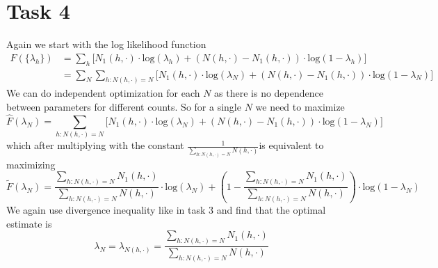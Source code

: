 \documentclass[%
   11pt,              %
   ngerman,           %
   a4paper,           %
   DIV11,             %
]{scrartcl}%
\begin{document}
\section*{Task 4}
Again we start with the log likelihood function
\begin{align*}
	F(\{\lambda_h\}) &= \sum_h \bigg[N_1(h,\cdot)\cdot\text{log}(\lambda_h) + (N(h,\cdot) - N_1(h, \cdot))\cdot \text{log}(1 - \lambda_h)\bigg] \\
	&= \sum_N \sum_{h\colon N(h,\cdot) = N} \bigg[N_1(h,\cdot)\cdot\text{log}(\lambda_N) + (N(h,\cdot) - N_1(h, \cdot))\cdot \text{log}(1 - \lambda_N)\bigg] 
\end{align*}
We can do independent optimization for each $N$ as there is no dependence between parameters for different counts. So for a single $N$ we need to maximize
\begin{equation*}
	\hat{F}(\lambda_N) = \sum_{h\colon N(h,\cdot) = N} \bigg[N_1(h,\cdot)\cdot\text{log}(\lambda_N) + (N(h,\cdot) - N_1(h, \cdot))\cdot \text{log}(1 - \lambda_N)\bigg] 
\end{equation*}
which after multiplying with the constant $\frac{1}{\sum_{h\colon N(h,\cdot) = N}N(h,\cdot)}$is equivalent to maximizing
\begin{equation*}
	\tilde{F}(\lambda_N) = \frac{\sum_{h\colon N(h,\cdot) = N}N_1(h,\cdot)}{\sum_{h\colon N(h,\cdot) = N}N(h,\cdot)}\cdot\text{log}(\lambda_N) + (1 - \frac{\sum_{h\colon N(h,\cdot) = N}N_1(h,\cdot)}{\sum_{h\colon N(h,\cdot) = N}N(h,\cdot)})\cdot \text{log}(1 - \lambda_N)
\end{equation*}
We again use divergence inequality like in task 3 and find that the optimal estimate is
\begin{equation*}
	\lambda_N = \lambda_{N(h,\cdot)} = \frac{\sum_{h\colon N(h,\cdot) = N}N_1(h,\cdot)}{\sum_{h\colon N(h,\cdot) = N}N(h,\cdot)}
\end{equation*}
\end{document}
